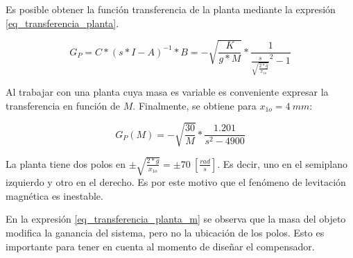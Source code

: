 \noindent Es posible obtener la función transferencia de la planta mediante la expresión \ref{eq_transferencia_planta}.

\begin{equation}\label{eq_transferencia_planta}
	G_{P}=C*(s*I-A)^{-1}*B=-\sqrt{\frac{K}{g*M}}*\frac{1}{{\frac{s}{\sqrt{\frac{2*g}{x_{1o}}}}^2-1}}
\end{equation}

\noindent \noindent Al trabajar con una planta cuya masa es variable es conveniente expresar la transferencia en función de $M$. Finalmente, se obtiene para $x_{1o}=4\:mm$:

\begin{equation} \label{eq_transferencia_planta_m}
	G_{P}(M)=-\sqrt{\frac{30}{M}}*\frac{1.201}{s^{2}-4900}
\end{equation}

\noindent La planta tiene dos polos en $\pm\sqrt{\frac{2*g}{x_{1o}}}=\pm70\:[\frac{rad}{s}]$. Es decir, uno en el semiplano izquierdo y otro en el derecho. Es por este motivo que el fenómeno de levitación magnética es inestable.

\noindent En la expresión \ref{eq_transferencia_planta_m} se observa que la masa del objeto modifica la ganancia del sistema, pero no la ubicación de los polos. Esto es importante para tener en cuenta al momento de diseñar el compensador.

